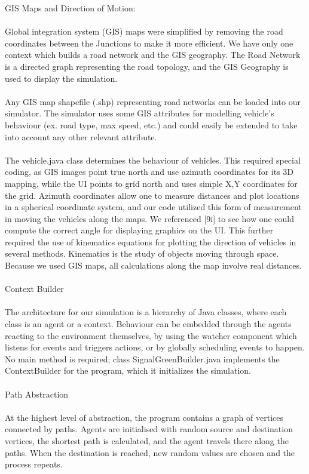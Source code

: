 \documentclass[11pt]{article}
\begin{document}
GIS Maps and Direction of Motion:
\\ \\
Global integration system (GIS) maps were simplified by removing the road coordinates between the Junctions to make it more efficient. We have only one context which builds a road network and the GIS geography. The Road Network is a directed graph representing the road topology, and the GIS Geography is used to display the simulation.
\\ \\
Any GIS map shapefile (.shp) representing road networks can be loaded into our simulator. The simulator uses some GIS attributes for modelling vehicle’s behaviour (ex. road type, max speed, etc.) and could easily be extended to take into account any other relevant attribute.
\\ \\
The vehicle.java class determines the behaviour of vehicles. This required special coding, as GIS images point true north and use azimuth coordinates for its 3D mapping, while the UI points to grid north and uses simple X,Y coordinates for the grid. Azimuth coordinates allow one to measure distances and plot locations in a spherical coordinate system, and our code utilized this form of measurement in moving the vehicles along the maps. We referenced [9i] to see how one could compute the correct angle for displaying graphics on the UI. This further required the use of kinematics equations for plotting the direction of vehicles in several methods. Kinematics is the study of objects moving through space. Because we used GIS maps, all calculations along the map involve real distances.
\\ \\
Context Builder
\\ \\
The architecture for our simulation is a hierarchy of Java classes, where each class is an agent or a context. Behaviour can be embedded through the agents reacting to the environment themselves, by using the watcher component which listens for events and triggers actions, or by globally scheduling events to happen. No main method is required; class SignalGreenBuilder.java implements the ContextBuilder for the program, which it initializes the simulation.
\\ \\
Path Abstraction
\\ \\
At the highest level of abstraction, the program contains a graph of vertices connected by paths. Agents are initialised with random source and destination vertices, the shortest path is calculated, and the agent travels there along the paths. When the destination is reached, new random values are chosen and the process repeats. 
\end{document}
